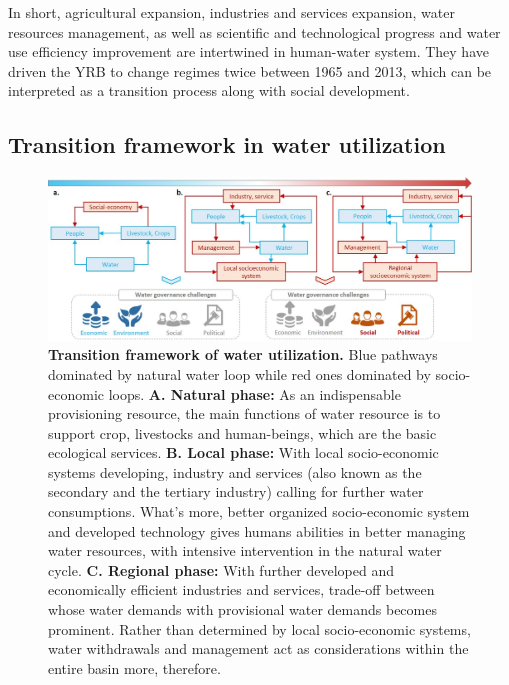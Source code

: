 \documentclass[9pt, twocolumn, twoside, lineno]{pnas-new}
\begin{document}
In short, agricultural expansion, industries and services expansion, water resources management, as well as scientific and technological progress and water use efficiency improvement are intertwined in human-water system. They have driven the YRB to change regimes twice between 1965 and 2013, which can be interpreted as a transition process along with social development.

\subsection*{Transition framework in water utilization}

\begin{figure}[th!]
	\centering
	\includegraphics[width=\linewidth]{../../figures/main/transition.jpg}
	\caption{
		\textbf{Transition framework of water utilization.} Blue pathways dominated by natural water loop while red ones dominated by socio-economic loops. 
		\textbf{A. Natural phase:} As an indispensable provisioning resource, the main functions of water resource is to support crop, livestocks and human-beings, which are the basic ecological services.
		\textbf{B. Local phase:} With local socio-economic systems developing, industry and services (also known as the secondary and the tertiary industry) calling for further water consumptions. What's more, better organized socio-economic system and developed technology gives humans abilities in better managing water resources, with intensive intervention in the natural water cycle. 
		\textbf{C. Regional phase:} With further developed and economically efficient industries and services, trade-off between whose water demands with provisional water demands becomes prominent. Rather than determined by local socio-economic systems, water withdrawals and management act as considerations within the entire basin more, therefore. 
	}
	\label{fig:summary}
\end{figure}
\end{document}
